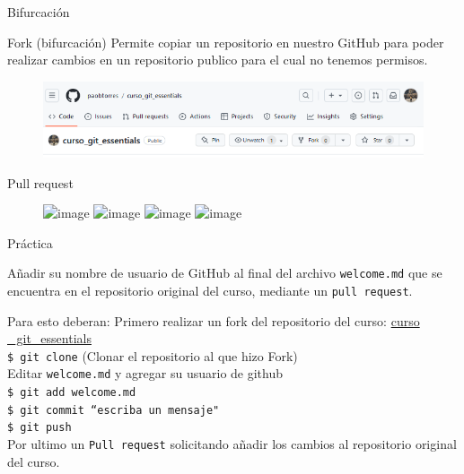 \documentclass{beamer}
\begin{document}
\begin{frame}{Bifurcación }

    \begin{block}{Fork (bifurcación)}
      Permite copiar un repositorio en nuestro GitHub para poder realizar cambios en un repositorio publico para el cual no tenemos permisos.
      \begin{figure}
        \includegraphics[width=\textwidth]{images/git-fork.PNG}
      \end{figure}
    \end{block}

  \end{frame}

  \begin{frame}{Pull request}

    \begin{figure}
      \includegraphics<1>[width=\textwidth]{images/git-pull-request-commit-ahead.png}
      \includegraphics<2>[width=\textwidth]{images/git-open-pull-request.PNG}
      \includegraphics<3>[width=0.8\textwidth]{images/git-open-pull-request-submit.PNG}
      \includegraphics<4>[width=0.7\textwidth]{images/git-pull-request-commit-final.png}
    \end{figure}


  \end{frame}

\begin{frame}{\LARGE Práctica}
  
  \begin{alertblock}{}

    Añadir su nombre de usuario de GitHub al final del archivo \texttt{welcome.md} que se encuentra en el repositorio original del curso, mediante un \texttt{pull request}. 
    
  \end{alertblock}

  \begin{block}{Para esto deberan:}
    Primero realizar un fork del repositorio del curso: \href{https://github.com/paobtorres/curso_git_essentials}{curso  \_git\_essentials} \\ 
    \texttt{\$ git clone} (Clonar el repositorio al que hizo Fork) \\ 
    Editar \texttt{welcome.md} y agregar su usuario de github \\ 
    \texttt{\$ git add \texttt{welcome.md}} \\ 
    \texttt{\$ git commit ``escriba un mensaje"} \\ 
    \texttt{\$ git push} \\ 
    Por ultimo un \texttt{Pull request} solicitando añadir los cambios al repositorio original del curso. 
  \end{block}



\end{frame}
\end{document}
